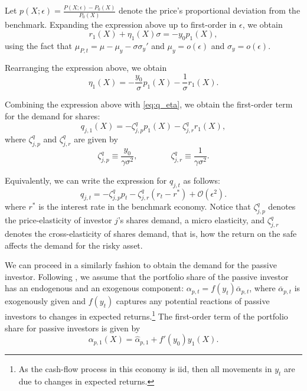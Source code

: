\documentclass[11pt,english]{article}
\begin{document}
Let $p(X;\epsilon) = \frac{P(X;\epsilon) - P_0(X)}{P_0(X)}$ denote the price's proportional deviation from the benchmark. 
Expanding the expression above up to first-order in $\epsilon$, we obtain
\begin{equation}
    r_{1}(X) + \eta_1(X) \sigma = -y_0 p_1(X),
\end{equation}
using the fact that $\mu_{P,t} = \mu - \mu_y - \sigma \sigma_y'$ and $\mu_y = o(\epsilon)$ and $\sigma_y = o(\epsilon)$.

Rearranging the expression above, we obtain
\begin{equation}
    \eta_1(X) = - \frac{y_0}{\sigma} p_1(X) - \frac{1}{\sigma} r_1(X).
\end{equation}

Combining the expression above with \eqref{eq:q_eta}, we obtain the first-order term for the demand for shares:
\begin{equation}
    q_{j,1}(X) = - \zeta_{j,p}^q p_1(X)- \zeta_{j,r}^q r_1(X),
 \end{equation}
 where $\zeta_{j,p}^q$ and $\zeta_{j,r}^q$ are given by
\begin{equation}
\zeta_{j,p}^q \equiv \frac{y_0}{\gamma \sigma^2}, \qquad \qquad \zeta_{j,r}^q \equiv \frac{1}{\gamma \sigma^2}.
\end{equation}

Equivalently, we can write the expression for $q_{j,t}$ as follows:
\begin{equation}
q_{j,t} = - \zeta_{j,p}^q p_t- \zeta_{j,r}^q (r_t -r^*) + \mathcal{O}(\epsilon^2).
\end{equation}
where $r^*$ is the interest rate in the benchmark economy. Notice that $\zeta_{j,p}^q$ denotes the price-elasticity of investor $j$'s shares demand, a micro elasticity, and $\zeta_{j,r}^q$ denotes the cross-elasticity of shares demand, that is, how the return on the safe affects the demand for the risky asset. 

We can proceed in a similarly fashion to obtain the demand for the passive investor. Following \citet{gabaix2020search}, we assume that the portfolio share of the passive investor has an endogenous and an exogenous component: $\alpha_{p,t
} = f(y_t) \overline{\alpha}_{p,t}$, where $\overline{\alpha}_{p,t}$ is exogenously given and $f(y_t)$ captures any potential reactions of passive investors to changes in expected returns.\footnote{As the cash-flow process in this economy is iid, then all movements in $y_t$ are due to changes in expected returns.} 
The first-order term of the portfolio share for passive investors is given by
\begin{equation}
    \alpha_{p,1}(X) = \hat{\alpha}_{p,1} + f'(y_0) y_1(X).
\end{equation}
\end{document}
